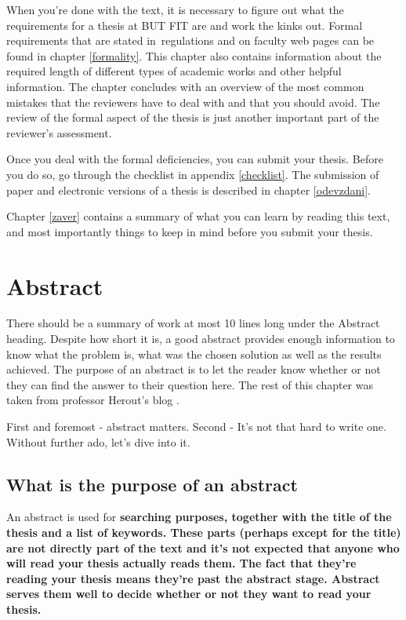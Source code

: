 When you're done with the text, it is necessary to figure out what the requirements for a thesis at BUT FIT are and work the kinks out. Formal requirements that are stated in~regulations and on faculty web pages can be found in chapter \ref{formality}. This chapter also contains information about the required length of different types of academic works and other helpful information. The chapter concludes with an overview of the most common mistakes that the reviewers have to deal with and that you should avoid. The review of the formal aspect of the thesis is just another important part of the reviewer's assessment.

Once you deal with the formal deficiencies, you can submit your thesis. Before you do so, go through the checklist in appendix \ref{checklist}. The submission of paper and electronic versions of a thesis is described in chapter \ref{odevzdani}.

Chapter \ref{zaver} contains a summary of what you can learn by reading this text, and most importantly things to keep in mind before you submit your thesis.

\chapter{Abstract}
\label{abstrakt}

There should be a summary of work at most 10 lines long under the Abstract heading. Despite how short it is, a good abstract provides enough information to know what the problem is, what was the chosen solution as well as the results achieved. The purpose of an abstract is to let the reader know whether or not they can find the answer to their question here. The rest of this chapter was taken from professor Herout's blog \cite{Herout}.
\bigskip

\noindent First and foremost - abstract matters. Second - It's not that hard to write one. Without further ado, let's dive into it.

\section{What is the purpose of an abstract}
An abstract is used for \bf searching \rm purposes, together with the title of the thesis and a list of keywords. These parts (perhaps except for the title) are not directly part of the text and it's not expected that anyone who will read your thesis actually reads them. The fact that they're reading your thesis means they're past the abstract stage. Abstract serves them well to decide \bf whether or not \rm they want to read your thesis.

